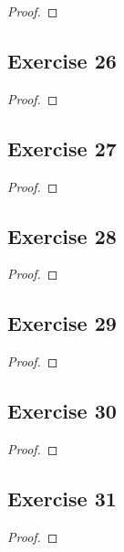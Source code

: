 \documentclass[14pt]{extarticle}
\begin{document}
\begin{proof}

\end{proof}

\subsection{Exercise 26}

\begin{proof}

\end{proof}

\subsection{Exercise 27}

\begin{proof}

\end{proof}

\subsection{Exercise 28}

\begin{proof}

\end{proof}

\subsection{Exercise 29}

\begin{proof}

\end{proof}

\subsection{Exercise 30}

\begin{proof}

\end{proof}

\subsection{Exercise 31}

\begin{proof}

\end{proof}
\end{document}
